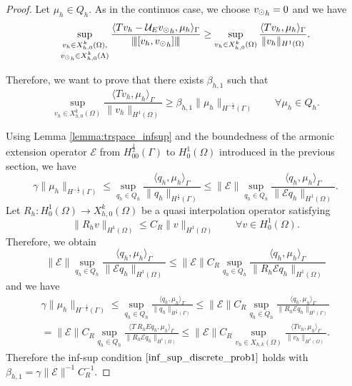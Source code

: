 \begin{proof}
Let $\mu_h \in Q_h$. As in the continuos case, we choose ${v_{\odot}}_h =0$ and we have
\begin{equation*}
\sup_{\substack{v_h \in X_{h,0}^k(\Omega),\\ {v_{\odot}}_h \in X_{h,0}^k(\Lambda)}} \frac{ \langle T v_h - \mathcal{U}_E {v_{\odot}}_h, \mu_h \rangle _{\Gamma}} {{\left\vert\kern-0.25ex\left\vert\kern-0.25ex\left\vert [v_h,  {v_{\odot}}_h] \right\vert\kern-0.25ex\right\vert\kern-0.25ex\right\vert}}
\geq \sup_{v_h \in X_{h,0}^k(\Omega)} \frac{ \langle T v_h, \mu_h \rangle _{\Gamma} } {\|v_h\|_{H^1(\Omega)}}.
\end{equation*}

Therefore, we want to prove that there exists $\beta_{h,1}$ such that
\begin{equation*}
\sup_{v_h \in X_{h,0}^k(\Omega)} \frac{ \langle T v_h, \mu_h \rangle _{\Gamma} } {\|v_h\|_{H^1(\Omega)}} \geq \beta_{h,1} \|\mu_h\|_{H^{-\frac 12}(\Gamma)} \qquad \forall \mu_h \in Q_h.
\end{equation*}

Using Lemma \ref{lemma:trspace_infsup} and the boundedness of the armonic extension operator $\mathcal{E}$ from $H^{\frac 12}_{00}(\Gamma)$ to $H^1_0(\Omega)$ introduced in the previous section, we have
\begin{equation*}
\gamma \|\mu_h\|_{H^{-\frac 12}(\Gamma)} \leq  \sup_{q_h \in Q_h} \frac{ \langle q_h, \mu_h \rangle _{\Gamma} } {\|q_h\|_{H^{\frac 12}(\Gamma)}} 
\leq 
\|\mathcal{E}\| \sup_{q_h \in Q_h} \frac{ \langle q_h, \mu_h \rangle _{\Gamma} } {\|\mathcal{E}q_h\|_{H^1(\Omega)}} .
\end{equation*}
Let $R_h: H^1_0(\Omega) \rightarrow X_{h,0}^k(\Omega)$ be a quasi interpolation operator satisfying 
\begin{equation*}
\|R_h v\|_{H^1(\Omega)} \leq C_R \|v\|_{H^1(\Omega)} \qquad \forall v \in H^1_0(\Omega).
\end{equation*}
Therefore, we obtain 
\begin{equation*}
\|\mathcal{E}\| \sup_{q_h \in Q_h} \frac{ \langle q_h, \mu_h \rangle _{\Gamma} } {\|\mathcal{E}q_h\|_{H^1(\Omega)}} 
\leq
\|\mathcal{E}\| C_R \sup_{q_h \in Q_h} \frac{ \langle q_h, \mu_h \rangle _{\Gamma} } {\|R_h \mathcal{E} q_h\|_{H^1(\Omega)}}
\end{equation*}
and we have
\begin{multline}
\gamma \|\mu_h\|_{H^{-\frac 12}(\Gamma)} 
\leq 
\sup_{q_h \in Q_h} \frac{ \langle q_h, \mu_h \rangle_{\Gamma} } {\|q_h\|_{H^{\frac 12}(\Gamma)}} 
\leq
\|\mathcal{E}\| C_R \sup_{q_h \in Q_h} \frac{ \langle q_h, \mu_h \rangle_{\Gamma} } {\|R_h \mathcal{E} q_h\|_{H^1(\Gamma)}}
\\
=
\|\mathcal{E}\| C_R \sup_{q_h \in Q_h} \frac{ \langle T \ R_h E q_h, \mu_h \rangle_{\Gamma} } {\|R_h \mathcal{E} q_h\|_{H^1(\Omega)}} 
\leq \|\mathcal{E}\| C_R \sup_{v_h \in X_{h,k}(\Omega)} \frac{ \langle T v_h, \mu_h \rangle_{\Gamma} } {\|v_h\|_{H^1(\Omega)}}. 
\end{multline}
Therefore the inf-sup condition $\eqref{inf_sup_discrete_prob1}$ holds with $\beta_{h,1} = \gamma \|\mathcal{E}\|^{-1} C_R^{-1} $.
\end{proof}
